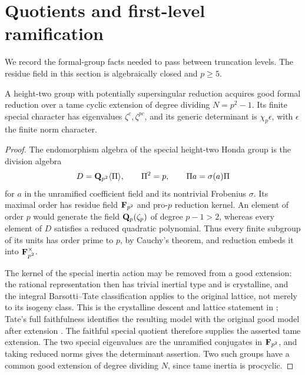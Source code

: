\section{Quotients and first-level ramification}\label{sec:quotients}
We record the formal-group facts needed to pass between truncation levels. The residue field in this section is algebraically closed and $p\ge5$.

\begin{lemma}\label{lem:tame-good}
A height-two group with potentially supersingular reduction acquires good formal reduction over a tame cyclic extension of degree dividing $N=p^2-1$. Its finite special character has eigenvalues $\zeta^c,\zeta^{pc}$, and its generic determinant is $\chi_p\epsilon$, with $\epsilon$ the finite norm character.
\end{lemma}
\begin{proof}
The endomorphism algebra of the special height-two Honda group is the division algebra
\[
 D=\mathbf Q_{p^2}\langle\Pi\rangle,
 \qquad \Pi^2=p,\qquad \Pi a=\sigma(a)\Pi
\]
for $a$ in the unramified coefficient field and its nontrivial Frobenius $\sigma$. Its maximal order has residue field $\mathbf F_{p^2}$ and pro-$p$ reduction kernel. An element of order $p$ would generate the field $\mathbf Q_p(\zeta_p)$ of degree $p-1>2$, whereas every element of $D$ satisfies a reduced quadratic polynomial. Thus every finite subgroup of its units has order prime to $p$, by Cauchy's theorem, and reduction embeds it into $\mathbf F_{p^2}^{\times}$.

The kernel of the special inertia action may be removed from a good extension: the rational representation then has trivial inertial type and is crystalline, and the integral Barsotti--Tate classification applies to the original lattice, not merely to its isogeny class. This is the crystalline descent and lattice statement in \citet[Theorem~2.2.7 and Proposition~A.6]{Kisin2006}; Tate's full faithfulness identifies the resulting model with the original good model after extension \citep[Theorem~4, p.~180, and Corollary~2, p.~181]{Tate1967}. The faithful special quotient therefore supplies the asserted tame extension. The two special eigenvalues are the unramified conjugates in $\mathbf F_{p^2}$, and taking reduced norms gives the determinant assertion. Two such groups have a common good extension of degree dividing $N$, since tame inertia is procyclic.
\end{proof}

